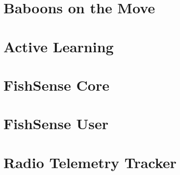 \section{Baboons on the Move}

\section{Active Learning}

\section{FishSense Core}

\section{FishSense User}

\section{Radio Telemetry Tracker}

